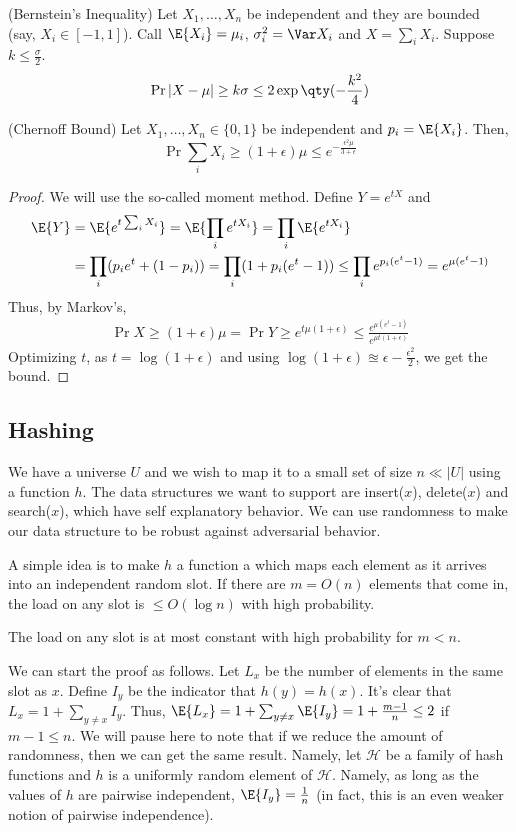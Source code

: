 \begin{theorem}
    (Bernstein's Inequality)  Let $X_1, \dots, X_n$ be independent and they are bounded (say, $X_i \in [-1, 1]$).
    Call $\E{X_i} = \mu_i$, $\sigma_i^2 = \Var X_i$ and $X = \sum_i X_i$. Suppose $k \le \frac{\sigma}{2}$.
    \[ \Pr{|X- \mu| \ge k \sigma} \le 2\exp\qty(-\frac{k^2}{4}) \]

    (Chernoff Bound) Let $X_1, \dots, X_n \in \{0, 1\}$ be independent and $p_i = \E{X_i}$. Then,
    \[ \Pr{\sum_i X_i \ge (1 + \epsilon) \mu} \le e^{-\frac{\epsilon^2 \mu}{3 + \epsilon}} \]
    \begin{proof}
        We will use the so-called moment method.
        Define $Y = e^{tX}$ and 
        \begin{align*}
            \E{Y} &= \E{e^{t \sum_i X_i}} = \E{\prod_i e^{tX_i}} = \prod_i \E{e^{tX_i}} \\
            &= \prod_i (p_i e^t + (1 - p_i)) = \prod_i (1 + p_i(e^t - 1)) \le \prod_i e^{p_i(e^t - 1)} = e^{\mu(e^t - 1)}
        \end{align*}
        Thus, by Markov's,
        \begin{align*}
            \Pr{X \ge (1 + \epsilon) \mu} = \Pr{Y \ge e^{t\mu(1 + \epsilon)}} \le \frac{e^{\mu (e^t - 1)}}{e^{\mu t(1 + \epsilon)}}
        \end{align*}
        Optimizing $t$, as $t = \log(1 + \epsilon)$ and using $\log (1+\epsilon) \approxeq \epsilon - \frac{\epsilon^2}{2}$,
        we get the bound.
    \end{proof}
\end{theorem}

\subsection{Hashing}
We have a universe $U$ and we wish to map it to a small set of size $n \ll |U|$ using
a function $h$. The data structures we want to support are insert($x$), delete($x$)
and search($x$), which have self explanatory behavior. We can use randomness to make our
data structure to be robust against adversarial behavior.

A simple idea is
to make $h$ a function a which maps each element as it arrives into
an independent random slot. If there are $m = O(n)$ elements
that come in, the load on any slot is $\le O(\log n)$ with high probability.
\begin{theorem}
    The load on any slot is at most constant with high probability for $m < n$.
\end{theorem}
We can start the proof as follows.
Let $L_x$ be the number of elements in the same slot as $x$.
Define $I_y$ be the indicator that $h(y) = h(x)$.
It's clear that $ L_x = 1 + \sum_{y \neq x} I_y$. Thus, $\E{L_x} = 1 + \sum_{y \neq x} \E{I_y} = 1 + \frac{m-1}{n} \le 2$
if $m - 1 \le n$. We will pause here to note that if we
reduce the amount of randomness, then we can get the same result.
Namely, let $\mathcal{H}$ be a family of hash functions
and $h$ is a uniformly random element of $\mathcal{H}$. Namely,
as long as the values of $h$ are pairwise independent, $\E{I_y} = \frac{1}{n}$
(in fact, this is an even weaker notion of pairwise independence).
